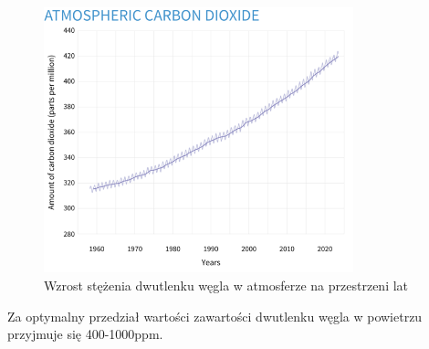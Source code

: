 \begin{figure}[H]
    \centering
    \includegraphics[width=0.8\textwidth]{zdj/more-co2.png}
    \caption{Wzrost stężenia dwutlenku węgla w atmosferze na przestrzeni lat}
\end{figure}

Za optymalny przedział wartości zawartości dwutlenku węgla w powietrzu przyjmuje się 400-1000ppm.